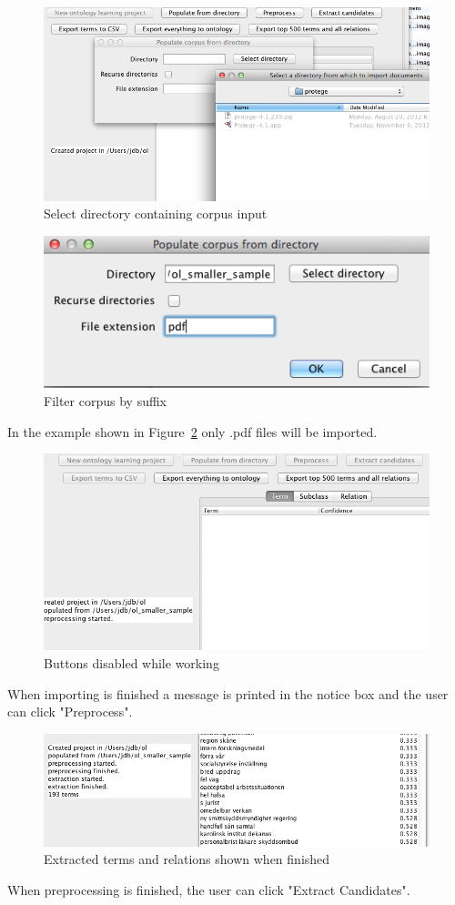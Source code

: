 \documentclass[a4paper]{report}
\begin{document}
\begin{figure}[H]
  \centering
  \includegraphics[width=.8\textwidth]{graphics/5._Select_directory_containing_corpus_input.png}
  \caption{Select directory containing corpus input}
  \label{fig:walkthrough5}
\end{figure}

\begin{figure}[H]
  \centering
  \includegraphics[width=.5\textwidth]{graphics/6._Filter_corpus_by_suffix.png}
  \caption{Filter corpus by suffix}
  \label{fig:walkthrough6}
\end{figure}
In the example shown in Figure~\ref{fig:walkthrough6} only .pdf files will be imported. 

\begin{figure}[H]
  \centering
  \includegraphics[width=.8\textwidth]{graphics/7._Buttons_disabled_while_working.png}
  \caption{Buttons disabled while working}
  \label{fig:walkthrough7}
\end{figure}
When importing is finished a message is printed in the notice box and the user can click "Preprocess". 

\begin{figure}[H]
  \centering
  \includegraphics[width=.8\textwidth]{graphics/8._Extracted_terms_and_relations_shown_when_finished.png}
  \caption{Extracted terms and relations shown when finished}
  \label{fig:walkthrough8}
\end{figure}
When preprocessing is finished, the user can click "Extract Candidates". 
\end{document}
